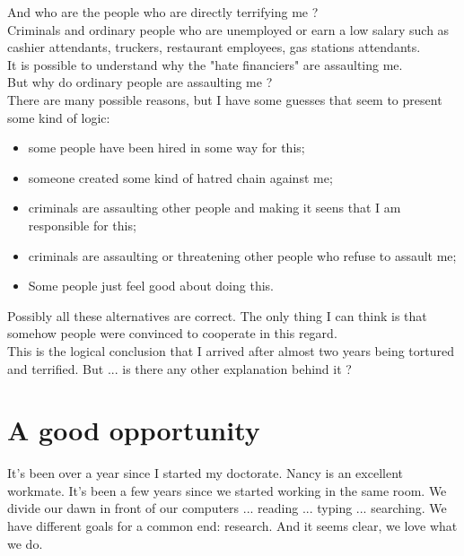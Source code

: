 \documentclass[11pt]{book}
\begin{document}
\noindent And who are the people who are directly terrifying me ? \\

\noindent Criminals and ordinary people who are unemployed or earn a low salary such as cashier attendants, truckers, restaurant employees, gas stations attendants. \\

\noindent It is possible to understand why the "hate financiers" are assaulting me. \\

\noindent But why do ordinary people are assaulting me ? \\

\noindent There are many possible reasons, but I have some guesses that seem to present some kind of logic:

\begin {itemize}
\item some people have been hired in some way for this;
\item someone created some kind of hatred chain against me;
\item criminals are assaulting other people and making it seens that I am responsible for this;
\item criminals are assaulting or threatening other people who refuse to assault me;
\item Some people just feel good about doing this.
\end{itemize}

\noindent Possibly all these alternatives are correct. The only thing I can think is that somehow people were convinced to cooperate in this regard. \\

\noindent This is the logical conclusion that I arrived after almost two years being tortured and terrified. But ... is there any other explanation behind it ?

\chapter{A good opportunity}

\noindent It's been over a year since I started my doctorate. Nancy is an excellent workmate. It's been a few years since we started working in the same room. We divide our dawn in front of our computers ... reading ... typing ... searching. We have different goals for a common end: research. And it seems clear, we love what we do. \\
\end{document}
